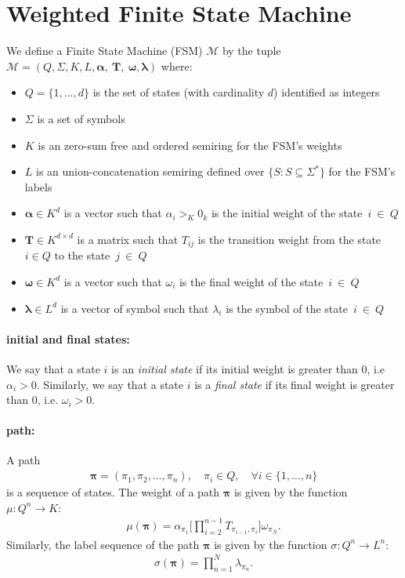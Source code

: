 \section{Weighted Finite State Machine}

We define a Finite State Machine (FSM) $\mathcal{M}$ by the tuple
$\mathcal{M} = (Q, \Sigma, K, L, \boldsymbol{\alpha},~\mathbf{T},~\boldsymbol{\omega}, \boldsymbol{\lambda})$
where:
\begin{itemize}
    \item $Q = \{1, \dots, d\}$ is the set of states (with cardinality $d$)
        identified as integers
    \item $\Sigma$ is a set of symbols
    \item $K$ is an zero-sum free and ordered semiring for the FSM's weights
    \item $L$ is an union-concatenation semiring defined over $\{ S : S \subseteq \Sigma^* \}$ for the FSM's labels
    \item $\boldsymbol{\alpha} \in K^d$ is a vector such that $\alpha_i >_K 0_k$
    is the initial weight of the state~$i~\in~Q$
    \item $\mathbf{T} \in K^{d\times d}$ is a matrix such that $T_{ij}$
        is the transition weight from the state $i \in Q$ to the state~$j~\in~Q$
    \item $\boldsymbol{\omega} \in K^d$ is a vector such that $\omega_i$
        is the final weight of the state~$i~\in~Q$
    \item $\boldsymbol{\lambda} \in L^d$ is a vector of symbol such that
        $\lambda_i$ is the symbol of the state~$i~\in~Q$
\end{itemize}

\paragraph{initial and final states:} We say that a state $i$ is an
\emph{initial state} if its initial weight is greater than $0$,
i.e $\alpha_i > 0$. Similarly, we say that a state $i$ is a
\emph{final state} if its final weight is greater than $0$, i.e.
$\omega_i > 0$.

\paragraph{path:} A path
\begin{align}
    \boldsymbol{\pi} = (\pi_1, \pi_2, \dots, \pi_n), \quad
        \pi_i \in Q, \quad \forall i \in \{1, \dots, n \}
\end{align}
is a sequence of states. The weight of a path $\boldsymbol{\pi}$ is
given by the function $\mu: Q^n \rightarrow K$:
\begin{align}
    \mu(\boldsymbol{\pi}) = \alpha_{\pi_1} \Big[
        \prod_{i=2}^{n-1} T_{\pi_{i-1},\pi_i} \Big] \omega_{\pi_N}.
\end{align}
Similarly, the label sequence of the path $\boldsymbol{\pi}$ is given
by the function $\sigma: Q^n \rightarrow L^n$:
\begin{align}
    \sigma(\boldsymbol{\pi}) = \prod_{n=1}^N \lambda_{\pi_n}.
\end{align}


